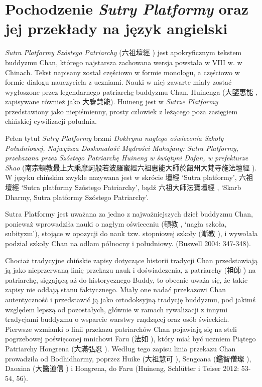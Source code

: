 \section{Pochodzenie \textit{Sutry Platformy} oraz jej przekłady na język angielski}
\textit{Sutra Platformy Szóstego Patriarchy} (六祖壇經 ) jest apokryficznym tekstem buddyzmu Chan, którego najstarsza zachowana wersja powstała w VIII w. w Chinach. Tekst napisany został częściowo w formie monologu, a częściowo w formie dialogu nauczyciela z uczniami. Nauki w niej zawarte miały zostać wygłoszone przez legendarnego patriarchę buddyzmu Chan, Huinenga (大鑒惠能 , zapisywane również jako 大鑒慧能). %
Huineng jest w \textit{Sutrze Platformy} przedstawiony jako niepiśmienny, prosty człowiek z leżącego poza zasięgiem chińskiej cywilizacji południa.

Pełen tytuł \textit{Sutry Platformy} brzmi \textit{Doktryna nagłego oświecenia Szkoły Południowej, Najwyższa Doskonałość Mądrości Mahajany: Sutra Platformy, przekazana przez Szóstego Patriarchę Huineng w świątyni Dafan, w prefekturze Shao} (南宗頓教最上大乘摩訶般若波羅蜜經六祖惠能大師於韶州大梵寺施法壇經 ). W języku chińskim zwykle nazywana jest w skrócie 壇經  `Sutra platformy', 六祖壇經  `Sutra platformy Szóstego Patriarchy', bądź 六祖大師法寶壇經 , `Skarb Dharmy, Sutra platformy Szóstego Patriarchy'.

Sutra Platformy jest uważana za jedno z najważniejszych dzieł buddyzmu Chan, ponieważ wprowadziła nauki o nagłym oświeceniu (頓教 , `nagła szkoła, subityzm'), stojące w opozycji do nauk tzw. stopniowej szkoły (漸教 ), i wywołała podział szkoły Chan na odłam północny i południowy. %
(Buswell 2004: 347-348).%

Chociaż tradycyjne chińskie zapisy dotyczące historii tradycji Chan przedstawiają ją jako nieprzerwaną linię przekazu nauk i doświadczenia, z patriarchy (祖師 ) na patriarchę, sięgającą aż do historycznego Buddy, to obecnie uważa się, że takie zapisy nie oddają stanu faktycznego. Miały one nadać przekazowi Chan autentyczność i przedstawić ją jako ortodoksyjną tradycję buddyzmu, pod jakimś względem lepszą od pozostałych, głównie w ramach rywalizacji z innymi tradycjami buddyzmu o wsparcie warstwy rządzącej oraz osób świeckich. Pierwsze wzmianki o linii przekazu patriarchów Chan pojawiają się na steli pogrzebowej poświęconej mnichowi Faru (法如 ), który miał być uczniem Piątego Patriarchy Hongrena (大滿弘忍 ). Według tego zapisu linia przekazu Chan prowadziła od Bodhidharmy, poprzez Huike (大祖慧可 ), Sengcana (鑑智僧璨 ), Daoxina (大醫道信 ) i Hongrena, do Faru (Huineng, Schlütter i Teiser 2012: 53-54, 56).

